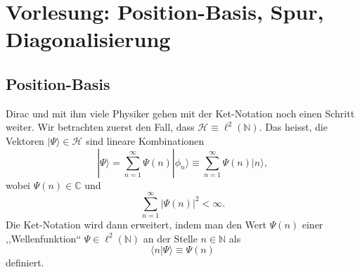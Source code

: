 
\section{Vorlesung: Position-Basis, Spur, Diagonalisierung}
\subsection{Position-Basis}
Dirac und mit ihm viele Physiker gehen mit der Ket-Notation noch einen Schritt weiter. Wir betrachten zuerst den Fall, dass $\mathcal{H} \equiv \ell^2(\mathbb{N})$. Das heisst, die Vektoren $|\Psi\rangle \in \mathcal{H}$ sind lineare Kombinationen 
\begin{equation}
	|\Psi\rangle = \sum_{n=1}^{\infty} \Psi(n)|\phi_n\rangle \equiv \sum_{n=1}^{\infty} \Psi(n)|n\rangle,
\end{equation}
wobei $\Psi(n)\in \mathbb{C}$ und
\begin{equation}
	\sum_{n=1}^{\infty} |\Psi(n)|^2 < \infty.
\end{equation}
Die Ket-Notation wird dann erweitert, indem man den Wert $\Psi(n)$ einer ,,Wellenfunktion`` $\Psi\in \ell^2(\mathbb{N})$ an der Stelle $n\in\mathbb{N}$ als
\begin{equation}
	\langle n|\Psi\rangle \equiv \Psi(n)
\end{equation}
definiert. 

